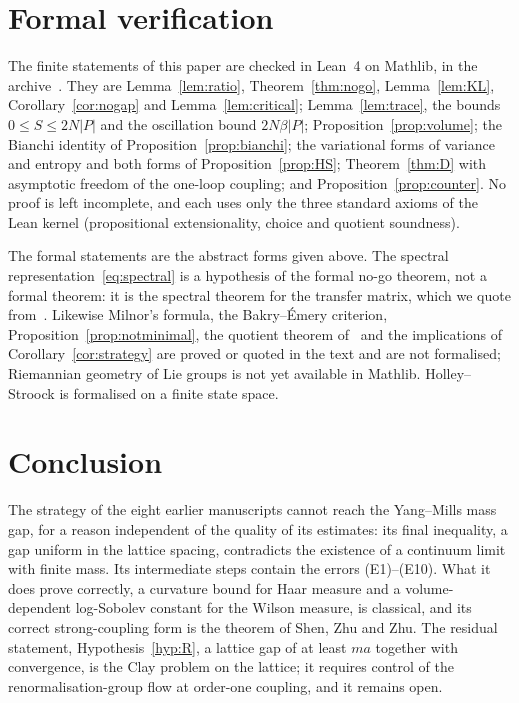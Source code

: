 \documentclass[aps,prd,twocolumn,superscriptaddress,nofootinbib,floatfix]{revtex4-2}
\theoremstyle{definition}
\theoremstyle{remark}
\begin{document}
\section{Formal verification}
\label{sec:lean}

The finite statements of this paper are checked in Lean~4 on Mathlib, in
the archive~\cite{Repo}. They are Lemma~\ref{lem:ratio},
Theorem~\ref{thm:nogo}, Lemma~\ref{lem:KL}, Corollary~\ref{cor:nogap} and
Lemma~\ref{lem:critical};
Lemma~\ref{lem:trace}, the bounds $0\le S\le2N|P|$ and the oscillation
bound $2N\beta|P|$; Proposition~\ref{prop:volume}; the Bianchi identity of
Proposition~\ref{prop:bianchi}; the variational forms of variance and
entropy and both forms of Proposition~\ref{prop:HS}; Theorem~\ref{thm:D}
with asymptotic freedom of the one-loop coupling; and
Proposition~\ref{prop:counter}. No proof is left incomplete, and each uses
only the three standard axioms of the Lean kernel (propositional
extensionality, choice and quotient soundness).

The formal statements are the abstract forms given above. The spectral
representation~\eqref{eq:spectral} is a hypothesis of the formal no-go
theorem, not a formal theorem: it is the spectral theorem for the transfer
matrix, which we quote from~\cite{OSei78,GJ87}. Likewise Milnor's formula,
the Bakry--\'Emery criterion, Proposition~\ref{prop:notminimal}, the
quotient theorem of~\cite{GKMS18} and the implications of
Corollary~\ref{cor:strategy} are proved or quoted in the text and are not
formalised; Riemannian geometry of Lie groups is not yet available in
Mathlib. Holley--Stroock is formalised on a finite state space.

\section{Conclusion}

The strategy of the eight earlier manuscripts cannot reach the Yang--Mills
mass gap, for a reason independent of the quality of its estimates: its
final inequality, a gap uniform in the lattice spacing, contradicts the
existence of a continuum limit with finite mass. Its intermediate steps
contain the errors (E1)--(E10). What it does prove correctly, a curvature
bound for Haar measure and a volume-dependent log-Sobolev constant for the
Wilson measure, is classical, and its correct strong-coupling form is the
theorem of Shen, Zhu and Zhu. The residual statement,
Hypothesis~\ref{hyp:R}, a lattice gap of at least $ma$ together with
convergence, is the Clay problem on the lattice; it requires
control of the renormalisation-group flow at order-one coupling, and it
remains open.
\end{document}
